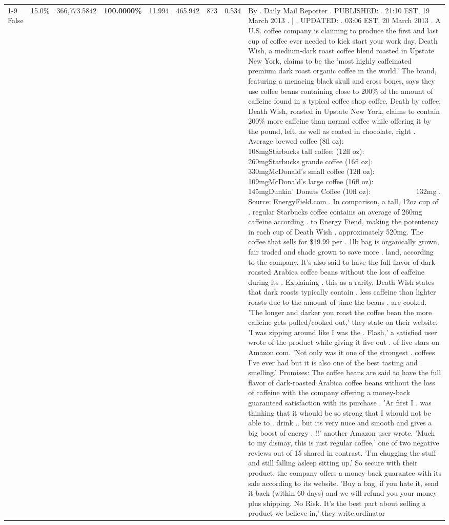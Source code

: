\begin{table}[H]
{\begin{tabular}{lllrlllll}
\cline{1-9}
False & 15.0\% & 366,773.5842 & \bfseries \color{red} 100.0000\% & 11.994 & 465.942 & 873 & 0.534 & By . Daily Mail Reporter . PUBLISHED: . 21:10 EST, 19 March 2013 . | . UPDATED: . 03:06 EST, 20 March 2013 . A U.S. coffee company is claiming to produce the first and last cup of coffee ever needed to kick start your work day. Death Wish, a medium-dark roast coffee blend roasted in Upstate New York, claims to be the 'most highly caffeinated premium dark roast organic coffee in the world.' The brand, featuring a menacing black skull and cross bones, says they use coffee beans containing close to 200\% of the amount of caffeine found in a typical coffee shop coffee. Death by coffee: Death Wish, roasted in Upstate New York, claims to contain 200\% more caffeine than normal coffee while offering it by the pound, left, as well as coated in chocolate, right . Average brewed coffee (8fl oz):              108mgStarbucks tall coffee: (12fl oz):                260mgStarbucks grande coffee (16fl oz):         330mgMcDonald's small coffee (12fl oz):           109mgMcDonald's large coffee (16fl oz):           145mgDunkin' Donuts Coffee (10fl oz):             132mg . Source: EnergyField.com . In comparison, a tall, 12oz cup of . regular Starbucks coffee contains an average of 260mg caffeine according . to Energy Fiend, making the potentency in each cup of Death Wish . approximately 520mg. The coffee that sells for \$19.99 per . 1lb bag is organically grown, fair traded and shade grown to save more . land, according to the company. It's also said to have the full flavor of dark-roasted Arabica coffee beans without the loss of caffeine during its . Explaining . this as a rarity, Death Wish states that dark roasts typically contain . less caffeine than lighter roasts due to the amount of time the beans . are cooked. 'The longer and darker you roast the coffee bean the more caffeine gets pulled/cooked out,' they state on their website. 'I was zipping around like I was the . Flash,' a satisfied user wrote of the product while giving it five out . of five stars on Amazon.com. 'Not only was it one of the strongest . coffees I've ever had but it is also one of the best tasting and . smelling.’ Promises: The coffee beans are said to have the full flavor of dark-roasted Arabica coffee beans without the loss of caffeine with the company offering a money-back guaranteed satisfaction with its purchase . 'Ar first I . was thinking that it whould be so strong that I whould not be able to . drink .. but its very nuce and smooth and gives a big boost of energy . !!' another Amazon user wrote. 'Much to my dismay, this is just regular coffee,' one of two negative reviews out of 15 shared in contrast. 'I'm chugging the stuff and still falling asleep sitting up.' So secure with their product, the company offers a money-back guarantee with its sale according to its website. 'Buy a bag, if you hate it, send it back (within 60 days) and we will refund you your money plus shipping. No Risk. It’s the best part about selling a product we believe in,' they write.ordinator \\

\end{tabular}}
\end{table}
